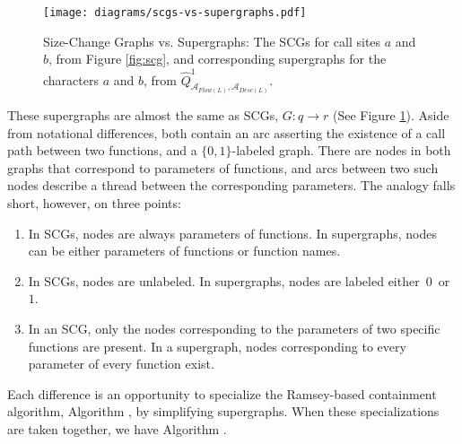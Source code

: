 \documentclass{LMCS}
\newcommand{\A}{{\mathcal A}}
\newcommand{\init}{{1}}
\newcommand{\superg}{\widehat}
\begin{document}
\begin{figure}[tb]
\begin{center}
{\texttt{[image: diagrams/scgs-vs-supergraphs.pdf]}}
\end{center}
\caption{Size-Change Graphs vs. Supergraphs: The SCGs for call sites $a$ and $b$, from Figure \ref{fig:scg}, and corresponding
supergraphs for the characters $a$ and $b$, from $\superg{Q}^\init_{\A_{Flow(L)},\A_{Desc(L)}}$.}\label{fig:scg_vs_supergraphs}
\end{figure}

These supergraphs are almost the same as SCGs, $G : q \rightarrow r$ (See Figure
\ref{fig:scg_vs_supergraphs}).  Aside from notational differences, both contain an arc asserting the
existence of a call path between two functions, and a $\{0,1\}$-labeled graph.  There are nodes in
both graphs that correspond to parameters of functions,
and arcs between two such nodes describe a thread between the corresponding
parameters. The analogy falls short, however, on three points:
\begin{enumerate}[(1)]
\item\label{Dif:FNames} In SCGs, nodes are always parameters of
functions.  In supergraphs, nodes can be either parameters of functions or
function names. 
\item\label{Dif:Labels} In SCGs, nodes are unlabeled. In
supergraphs, nodes are labeled either~$0$~or~$1$. 
\item\label{Dif:Width} In an SCG, only the nodes corresponding to
the parameters of two specific functions are present. In a supergraph, nodes 
corresponding to every parameter of every function exist. 
\end{enumerate}


Each difference is an opportunity to specialize the Ramsey-based containment
algorithm, Algorithm \SGS, by simplifying supergraphs.
When these specializations are taken together, we have Algorithm \LJB.
\end{document}
